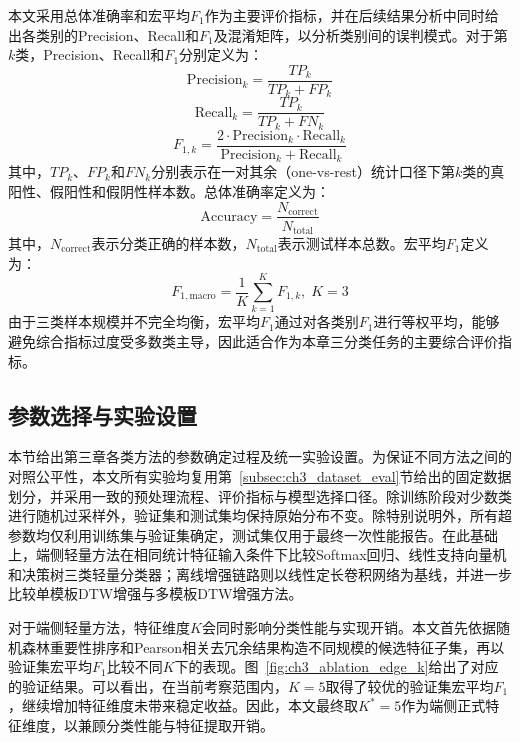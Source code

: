 \documentclass{xdupgthesis}
\providecommand{\FloatBarrier}{}
\begin{document}
本文采用总体准确率和宏平均$F_1$作为主要评价指标，并在后续结果分析中同时给出各类别的Precision、Recall和$F_1$及混淆矩阵，以分析类别间的误判模式。对于第$k$类，Precision、Recall和$F_1$分别定义为：
\begin{equation}
\mathrm{Precision}_k=\frac{TP_k}{TP_k+FP_k}
\end{equation}
\begin{equation}
\mathrm{Recall}_k=\frac{TP_k}{TP_k+FN_k}
\end{equation}
\begin{equation}
F_{1,k}=
\frac{2\cdot \mathrm{Precision}_k \cdot \mathrm{Recall}_k}
{\mathrm{Precision}_k+\mathrm{Recall}_k}
\end{equation}
其中，$TP_k$、$FP_k$和$FN_k$分别表示在一对其余（one-vs-rest）统计口径下第$k$类的真阳性、假阳性和假阴性样本数。总体准确率定义为：
\begin{equation}
    \mathrm{Accuracy}=\frac{N_{\mathrm{correct}}}{N_{\mathrm{total}}}
\end{equation}
其中，$N_{\mathrm{correct}}$表示分类正确的样本数，$N_{\mathrm{total}}$表示测试样本总数。宏平均$F_1$定义为：
\begin{equation}
    F_{1,\mathrm{macro}}=\frac{1}{K}\sum_{k=1}^{K}F_{1,k},\; K=3
\end{equation}
由于三类样本规模并不完全均衡，宏平均$F_1$通过对各类别$F_1$进行等权平均，能够避免综合指标过度受多数类主导，因此适合作为本章三分类任务的主要综合评价指标。

\FloatBarrier

\subsection{参数选择与实验设置}
\label{subsec:ch3_param_setup}

本节给出第三章各类方法的参数确定过程及统一实验设置。为保证不同方法之间的对照公平性，本文所有实验均复用第~\ref{subsec:ch3_dataset_eval}节给出的固定数据划分，并采用一致的预处理流程、评价指标与模型选择口径。除训练阶段对少数类进行随机过采样外，验证集和测试集均保持原始分布不变。除特别说明外，所有超参数均仅利用训练集与验证集确定，测试集仅用于最终一次性能报告。在此基础上，端侧轻量方法在相同统计特征输入条件下比较Softmax回归、线性支持向量机和决策树三类轻量分类器；离线增强链路则以线性定长卷积网络为基线，并进一步比较单模板DTW增强与多模板DTW增强方法。

对于端侧轻量方法，特征维度$K$会同时影响分类性能与实现开销。本文首先依据随机森林重要性排序和Pearson相关去冗余结果构造不同规模的候选特征子集，再以验证集宏平均$F_1$比较不同$K$下的表现。图~\ref{fig:ch3_ablation_edge_k}给出了对应的验证结果。可以看出，在当前考察范围内，$K=5$取得了较优的验证集宏平均$F_1$，继续增加特征维度未带来稳定收益。因此，本文最终取$K^\ast=5$作为端侧正式特征维度，以兼顾分类性能与特征提取开销。
\end{document}
